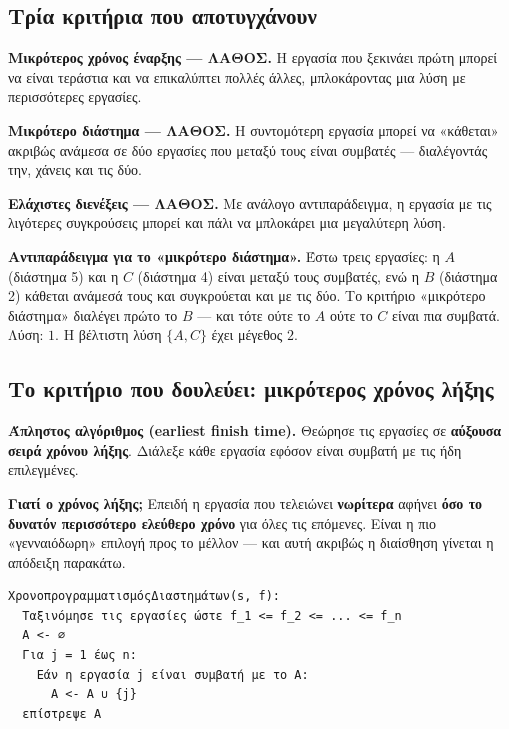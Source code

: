 \documentclass[11pt,a4paper]{article}
\begin{document}
\subsection{Τρία κριτήρια που αποτυγχάνουν}

\begin{warningbox}
\textbf{Μικρότερος χρόνος έναρξης --- ΛΑΘΟΣ.} Η εργασία που ξεκινάει πρώτη
μπορεί να είναι τεράστια και να επικαλύπτει πολλές άλλες, μπλοκάροντας μια λύση
με περισσότερες εργασίες.

\textbf{Μικρότερο διάστημα --- ΛΑΘΟΣ.} Η συντομότερη εργασία μπορεί να «κάθεται»
ακριβώς ανάμεσα σε δύο εργασίες που μεταξύ τους είναι συμβατές --- διαλέγοντάς
την, χάνεις και τις δύο.

\textbf{Ελάχιστες διενέξεις --- ΛΑΘΟΣ.} Με ανάλογο αντιπαράδειγμα, η εργασία με
τις λιγότερες συγκρούσεις μπορεί και πάλι να μπλοκάρει μια μεγαλύτερη λύση.
\end{warningbox}

\textbf{Αντιπαράδειγμα για το «μικρότερο διάστημα».} Έστω τρεις εργασίες: η $A$
(διάστημα 5) και η $C$ (διάστημα 4) είναι μεταξύ τους συμβατές, ενώ η $B$
(διάστημα 2) κάθεται ανάμεσά τους και συγκρούεται και με τις δύο. Το κριτήριο
«μικρότερο διάστημα» διαλέγει πρώτο το $B$ --- και τότε ούτε το $A$ ούτε το $C$
είναι πια συμβατά. Λύση: $1$. Η βέλτιστη λύση $\{A, C\}$ έχει μέγεθος $2$.

\subsection{Το κριτήριο που δουλεύει: μικρότερος χρόνος λήξης}

\begin{keypoint}
\textbf{Άπληστος αλγόριθμος (earliest finish time).} Θεώρησε τις εργασίες σε
\textbf{αύξουσα σειρά χρόνου λήξης}. Διάλεξε κάθε εργασία εφόσον είναι συμβατή με
τις ήδη επιλεγμένες.
\end{keypoint}

\begin{intuition}
\textbf{Γιατί ο χρόνος λήξης;} Επειδή η εργασία που τελειώνει \textbf{νωρίτερα}
αφήνει \textbf{όσο το δυνατόν περισσότερο ελεύθερο χρόνο} για όλες τις επόμενες.
Είναι η πιο «γενναιόδωρη» επιλογή προς το μέλλον --- και αυτή ακριβώς η διαίσθηση
γίνεται η απόδειξη παρακάτω.
\end{intuition}

\begin{codebox}
\begin{verbatim}
ΧρονοπρογραμματισμόςΔιαστημάτων(s, f):
  Ταξινόμησε τις εργασίες ώστε f_1 <= f_2 <= ... <= f_n
  A <- ∅
  Για j = 1 έως n:
    Εάν η εργασία j είναι συμβατή με το A:
      A <- A ∪ {j}
  επίστρεψε A
\end{verbatim}
\end{codebox}
\end{document}

